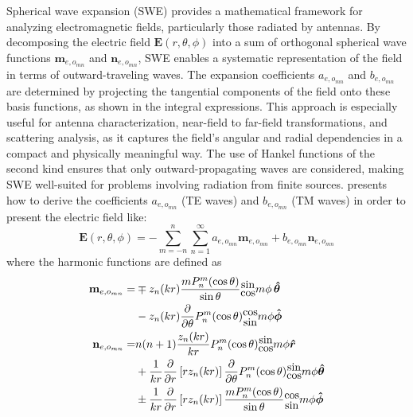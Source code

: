 \documentclass{article}
\begin{document}
Spherical wave expansion (SWE) provides a mathematical framework for analyzing electromagnetic fields, particularly those radiated by antennas. By decomposing the electric field \(\mathbf{E}(r, \theta, \phi)\) into a sum of orthogonal spherical wave functions \(\mathbf{m}_{e,o_{mn}}\) and \(\mathbf{n}_{e,o_{mn}}\), SWE enables a systematic representation of the field in terms of outward-traveling waves. The expansion coefficients \(a_{e,o_{mn}}\) and \(b_{e,o_{mn}}\) are determined by projecting the tangential components of the field onto these basis functions, as shown in the integral expressions. This approach is especially useful for antenna characterization, near-field to far-field transformations, and scattering analysis, as it captures the field's angular and radial dependencies in a compact and physically meaningful way. The use of Hankel functions of the second kind ensures that only outward-propagating waves are considered, making SWE well-suited for problems involving radiation from finite sources. \citet{Ludwig1971NearfieldFT} presents how to derive the coefficients \(a_{e,o_{mn}}\) (TE waves) and \(b_{e,o_{mn}}\) (TM waves) in order to present the electric field like:
\begin{equation}
    \mathbf{E}(r,\theta,\phi)=-\sum_{m=-n}^n \sum_{n=1}^\infty a_{e,o_{mn}} \mathbf{m}_{e,o_{mn}} + b_{e,o_{mn}} \mathbf{n}_{e,o_{mn}}
\end{equation}
where the harmonic functions are defined as
\begin{equation}
    \begin{split}
        \mathbf{m}_{e,o_{mn}} =& \mp z_n(kr) \frac{m P_n^m(\cos \theta)}{\sin \theta} \stackanchor{$\sin$}{$\cos$} m \phi \, \boldsymbol{\hat{\theta}} \\
        &- z_n(kr) \frac{\partial}{\partial \theta} P_n^m(\cos \theta)\stackanchor{$\cos$}{$\sin$}m\phi \boldsymbol{\hat{\phi}}\\
        \mathbf{n}_{e,o_{mn}} =& n(n+1) \frac{z_n(kr)}{kr} P_n^m(\cos \theta)\stackanchor{$\sin$}{$\cos$} m \phi \boldsymbol{\hat{r}} \\
        &+ \frac{1}{kr} \frac{\partial}{\partial r} \left[ r z_n(kr) \right] \frac{\partial}{\partial \theta} P_n^m(\cos \theta)\stackanchor{$\sin$}{$\cos$} m \phi \boldsymbol{\hat{\theta}} \\
        &\pm \frac{1}{k r} \frac{\partial}{\partial r} \left[r z_n(k r) \right] \frac{m P_n^m(\cos \theta)}{\sin \theta}\stackanchor{$\cos$}{$\sin$} m \phi \boldsymbol{\hat{\phi}}
    \end{split}
\end{equation}
\end{document}
